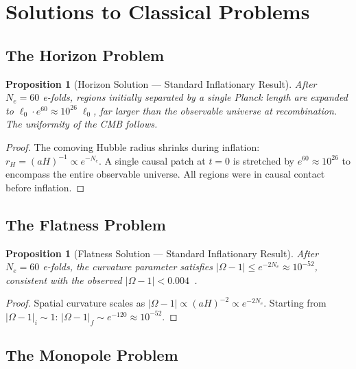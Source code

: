 \documentclass[12pt,a4paper]{article}
\newtheorem{proposition}[theorem]{Proposition}
\theoremstyle{definition}
\theoremstyle{remark}
\begin{document}
\section{Solutions to Classical Problems}
\label{sec:problems}

\subsection{The Horizon Problem}

\begin{proposition}[Horizon Solution --- Standard Inflationary Result]
\label{thm:horizon}
After $N_e = 60$ e-folds, regions initially separated by
a single Planck length are expanded to
$\ell_0 \cdot e^{60} \approx 10^{26}\;\ell_0$, far larger
than the observable universe at recombination.  The
uniformity of the CMB follows.
\end{proposition}

\begin{proof}
The comoving Hubble radius shrinks during inflation:
$r_H = (aH)^{-1} \propto e^{-N_e}$.  A single causal
patch at $t = 0$ is stretched by $e^{60} \approx
10^{26}$ to encompass the entire observable universe.
All regions were in causal contact before inflation.
\end{proof}

\subsection{The Flatness Problem}

\begin{proposition}[Flatness Solution --- Standard Inflationary Result]
\label{thm:flatness}
After $N_e = 60$ e-folds, the curvature parameter
satisfies
$|\Omega - 1| \leq e^{-2N_e} \approx 10^{-52}$,
consistent with the observed
$|\Omega - 1| < 0.004$~\cite{Planck2018}.
\end{proposition}

\begin{proof}
Spatial curvature scales as
$|\Omega - 1| \propto (aH)^{-2} \propto e^{-2N_e}$.
Starting from $|\Omega - 1|_i \sim 1$:
$|\Omega - 1|_f \sim e^{-120} \approx 10^{-52}$.
\end{proof}

\subsection{The Monopole Problem}
\end{document}
